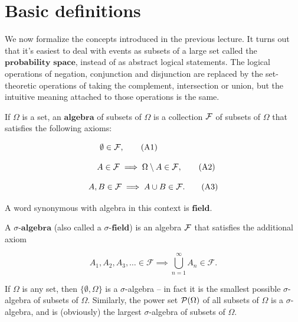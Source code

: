 \section{Basic definitions}
\label{basic-def}

We now formalize the concepts introduced in the
previous lecture. It turns out that it's easiest to
deal with events as subsets of a large set called the
$\textbf{probability space}$, instead of as abstract
logical statements. The logical operations of
negation, conjunction and disjunction are replaced by
the set-theoretic operations of taking the complement,
intersection or union, but the intuitive meaning
attached to those operations is the same.

\begin{defn}[Algebra]
If $\Omega$ is a set, an $\textbf{algebra}$ of
subsets of $\Omega$ is a collection ${\cal F}$ of
subsets of $\Omega$ that satisfies the following
axioms:

\begin{equation*}
\emptyset \in {\cal F},  \tag{A1}\qquad\qquad\qquad
\end{equation*}

\begin{equation*}
 \ \ A \in {\cal F} \implies \Omega\setminus A \in {\cal F}, \tag{A2} \\
\end{equation*}

\begin{equation*}
A,B \in {\cal F} \implies A\cup B \in {\cal F}.  \tag{A3}
\end{equation*}

\noindent A word synonymous with algebra in this context is
$\textbf{field}$.
\end{defn}

\begin{defn}
A  $\textbf{$\sigma$-algebra}$ (also called a
$\textbf{$\sigma$-field}$) is an algebra ${\cal F}$
that satisfies the additional axiom

\begin{equation*}
A_1, A_2, A_3, \ldots \in \mathcal{F}
\implies
\bigcup_{n=1}^{\infty} A_n \in \mathcal{F}.
\tag{A4}
\end{equation*}

\end{defn}

\begin{example}
If $\Omega$ is any set, then $\{ \emptyset, \Omega \}$
is a $\sigma$-algebra -- in fact it is the smallest
possible $\sigma$-algebra of subsets of $\Omega$.
Similarly, the power set ${\cal P}(\Omega)$ of all
subsets of $\Omega$ is a $\sigma$-algebra, and is
(obviously) the largest $\sigma$-algebra of subsets
of $\Omega$.
\end{example}


